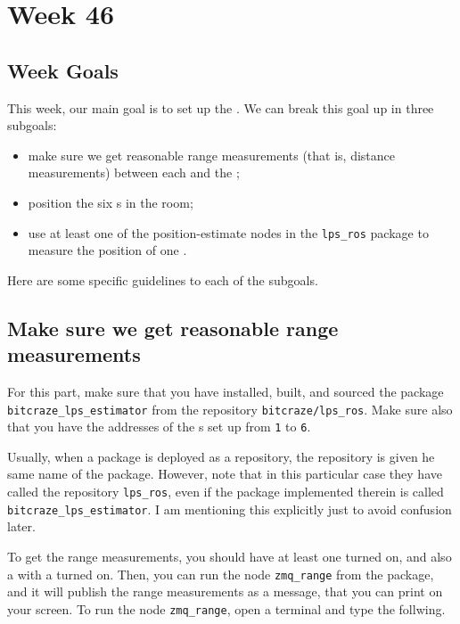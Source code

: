 \chapter*{Week 46}





\section*{Week Goals}

This week, our main goal is to set up the \LPS.
We can break this goal up in three subgoals:
\begin{itemize}
  \item make sure we get reasonable range measurements (that is, distance measurements) between each \LPN{} and the \LPD;
  \item position the six \LPN{}s in the room;
  \item use at least one of the position-estimate \ROS nodes in the \lstinline|lps_ros| package to measure the position of one \CF.
\end{itemize}

Here are some specific guidelines to each of the subgoals.








\section*{Make sure we get reasonable range measurements}

For this part, make sure that you have installed, built, and sourced the \ROS{} package \lstinline|bitcraze_lps_estimator| from the \Github{} repository \lstinline|bitcraze/lps_ros|.
Make sure also that you have the addresses of the \LPN{}s set up from \texttt{1} to \texttt{6}.

Usually, when a \ROS{} package is deployed as a \Github{} repository, the repository is given he same name of the package. However, note that in this particular case they have called the repository \lstinline|lps_ros|, even if the \ROS{} package implemented therein is called \lstinline|bitcraze_lps_estimator|.
I am mentioning this explicitly just to avoid confusion later.

To get the range measurements, you should have at least one \LPN{} turned on, and also a \CF{} with a \LPD{} turned on.
Then, you can run the node \lstinline|zmq_range| from the package, and it will publish the range measurements as a \ROS{} message, that you can print on your screen.
To run the node  \lstinline|zmq_range|, open a terminal and type the follwing.

